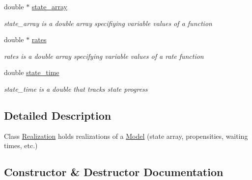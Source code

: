 \begin{DoxyCompactItemize}
\mbox{\label{class_realization_a126f89978f0407873473222171333ee1}} 
double $\ast$ \hyperlink{class_realization_a126f89978f0407873473222171333ee1}{state\+\_\+array}
\begin{DoxyCompactList}\small\item\em state\+\_\+array is a double array specifiying variable values of a function \end{DoxyCompactList}\item 
\mbox{\label{class_realization_a9c52d8c6aa0ad99dbbec1e98302db7d8}} 
double $\ast$ \hyperlink{class_realization_a9c52d8c6aa0ad99dbbec1e98302db7d8}{rates}
\begin{DoxyCompactList}\small\item\em rates is a double array specifying variable values of a rate function \end{DoxyCompactList}\item 
\mbox{\label{class_realization_a7c4def45c4833072317517b71e723793}} 
double \hyperlink{class_realization_a7c4def45c4833072317517b71e723793}{state\+\_\+time}
\begin{DoxyCompactList}\small\item\em state\+\_\+time is a double that tracks state progress \end{DoxyCompactList}\end{DoxyCompactItemize}


\subsection{Detailed Description}
Class \hyperlink{class_realization}{Realization} holds realizations of a \hyperlink{class_model}{Model} (state array, propensities, waiting times, etc.) 

\subsection{Constructor \& Destructor Documentation}
\mbox{\label{class_realization_af4cfb6f2221bef9ba5ad09564796677f}} 
